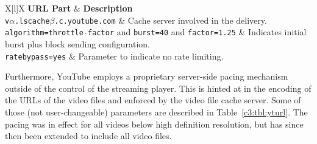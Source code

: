 \begin{table}[htb]
\caption{Transmission related parameters from YouTube's video URL setup.}
\label{c3:tbl:yturl}
	\centering
	\begin{tabu}{X[l]X}
		\toprule
		\textbf{\gls{URL} Part} & \textbf{Description} \\ 
		\midrule
		\texttt{v$\alpha$.lscache$\beta$.c.youtube.com} &  Cache server involved in the delivery.\\
		\texttt{algorithm=throttle-factor} and \texttt{burst=40} and \texttt{factor=1.25} & Indicates initial burst plus block sending configuration. \\
		\texttt{ratebypass=yes} & Parameter to indicate no rate limiting.\\
		\bottomrule
	\end{tabu}
\end{table}

Furthermore, YouTube employs a proprietary server-side pacing mechanism outside of the control of the streaming player. This is hinted at in the encoding of the \glspl{URL} of the video files and enforced by the video file cache server. Some of those (not user-changeable) parameters are described in Table~\ref{c3:tbl:yturl}. The pacing was in effect for all videos below high definition resolution, but has since then been extended to include all video files. 

